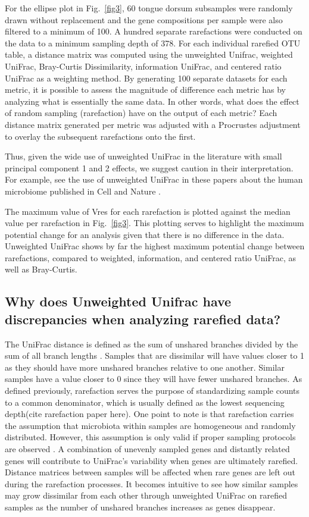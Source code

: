 \documentclass[10pt,letterpaper]{article}
\begin{document}
For the ellipse plot in Fig.~\ref{fig3}, 60 tongue dorsum subsamples were randomly drawn without replacement and the gene compositions per sample were also filtered to a minimum of 100. A hundred separate rarefactions were conducted on the data to a minimum sampling depth of 378. For each individual rarefied OTU table, a distance matrix was computed using the unweighted Unifrac, weighted UniFrac, Bray-Curtis Dissimilarity, information UniFrac, and centered ratio UniFrac as a weighting method. By generating 100 separate datasets for each metric, it is possible to assess the magnitude of difference each metric has by analyzing what is essentially the same data. In other words, what does the effect of random sampling (rarefaction) have on the output of each metric? Each distance matrix generated per metric was adjusted with a Procrustes adjustment to overlay the subsequent rarefactions onto the first.

Thus, given the wide use of unweighted UniFrac in the literature with small principal component 1 and 2 effects, we suggest caution in their interpretation. For example, see the use of unweighted UniFrac in these papers about the human microbiome published in Cell\cite{hsiao2013microbiota} and Nature \cite{sonnenburg2016diet}.

The maximum value of Vres for each rarefaction is plotted against the median value per rarefaction in Fig.~\ref{fig3}. This plotting serves to highlight the maximum potential change for an analysis given that there is no difference in the data. Unweighted UniFrac shows by far the highest maximum potential change between rarefactions, compared to weighted, information, and centered ratio UniFrac, as well as Bray-Curtis.

\subsection{Why does Unweighted Unifrac have discrepancies when analyzing rarefied data?}
The UniFrac distance is defined as the sum of unshared branches divided by the sum of all branch lengths \cite{lozupone2005unifrac}. Samples that are dissimilar will have values closer to 1 as they should have more unshared branches relative to one another. Similar samples have a value closer to 0 since they will have fewer unshared branches. As defined previously, rarefaction serves the purpose of standardizing sample counts to a common denominator, which is usually defined as the lowest sequencing depth(cite rarefaction paper here). One point to note is that rarefaction carries the assumption that microbiota within samples are homogeneous and randomly distributed. However, this assumption is only valid if proper sampling protocols are observed \cite{gorzelak2015methods}. A combination of unevenly sampled genes and distantly related genes will contribute to UniFrac's variability when genes are ultimately rarefied. Distance matrices between samples will be affected when rare genes are left out during the rarefaction processes. It becomes intuitive to see how similar samples may grow dissimilar from each other through unweighted UniFrac on rarefied samples as the number of unshared branches increases as genes disappear.
\end{document}
